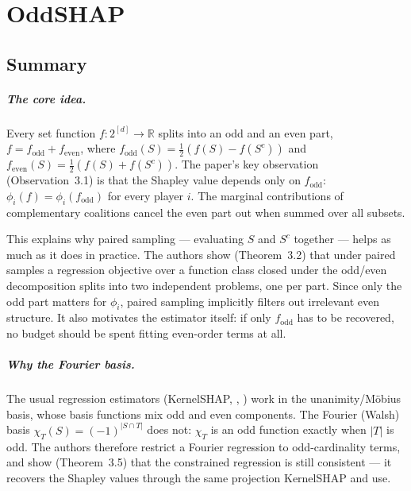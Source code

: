 \chapter{OddSHAP}
\label{sec:oddshap}

\section{Summary}
\label{sec:oddshap:summary}


\paragraph{The core idea.}
Every set function $f: 2^{[d]} \to \mathbb{R}$ splits into an odd and an even part,
$f = f_{\mathrm{odd}} + f_{\mathrm{even}}$, where
$f_{\mathrm{odd}}(S) = \tfrac{1}{2}\left(f(S) - f(S^{c})\right)$ and
$f_{\mathrm{even}}(S) = \tfrac{1}{2}\left(f(S) + f(S^{c})\right)$. The paper's key observation
(Observation~3.1) is that the Shapley value depends only on $f_{\mathrm{odd}}$:
$\phi_i(f) = \phi_i(f_{\mathrm{odd}})$ for every player $i$. The marginal contributions of
complementary coalitions cancel the even part out when summed over all subsets.

This explains why paired sampling --- evaluating $S$ and $S^{c}$ together --- helps as much as
it does in practice. The authors show (Theorem~3.2) that under paired samples a regression
objective over a function class closed under the odd/even decomposition splits into two
independent problems, one per part. Since only the odd part matters for $\phi_i$, paired
sampling implicitly filters out irrelevant even structure. It also motivates the estimator
itself: if only $f_{\mathrm{odd}}$ has to be recovered, no budget should be spent fitting
even-order terms at all.

\paragraph{Why the Fourier basis.}
The usual regression estimators (KernelSHAP, \leverageshap{}, \polyshap{}) work in the
unanimity/Möbius basis, whose basis functions mix odd and even components. The Fourier (Walsh)
basis $\chi_T(S) = (-1)^{|S \cap T|}$ does not: $\chi_T$ is an odd function exactly when $|T|$
is odd. The authors therefore restrict a Fourier regression to odd-cardinality terms, and show
(Theorem~3.5) that the constrained regression is still consistent --- it recovers the Shapley
values through the same projection KernelSHAP and \polyshap{} use.

